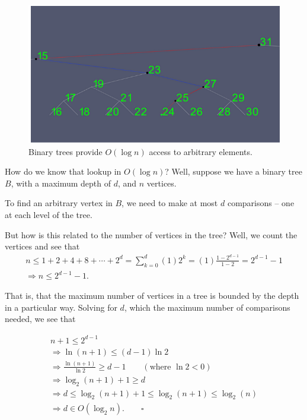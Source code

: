 \documentclass[a4paper,10pt]{report}
\begin{document}
\begin{figure}[h!]
	\begin{centering}
	\begin{center}
	\includegraphics[width=\linewidth]{./binary_tree_search.png}
	\caption{Binary trees provide $O(\log n)$ access to arbitrary elements.}
	\label{fig:??????}
	\end{center}
	\par\end{centering}
\end{figure}
How do we know that lookup in $O(\log n)$? Well, suppose we have a binary tree $B$, with a maximum depth of $d$, and $n$ vertices.

To find an arbitrary vertex in $B$, we need to make at most $d$ comparisons -- one at each level of the tree.

But how is this related to the number of vertices in the tree?
Well, we count the vertices and see that
\begin{align*}
	n \leq 1 + 2 + 4 + 8 + \cdots + 2^d = \sum_{k=0}^d (1)2^k =(1)\frac{1-2^{d-1}}{1-2} = 2^{d-1} -1 \\
	\Rightarrow n \leq 2^{d-1} -1.
\end{align*}

That is, that the maximum number of vertices in a tree is bounded by the depth in a particular way. Solving for $d$, which the maximum number of comparisons needed, we see that

\begin{align*}
	n+1 \leq 2^{d-1}  \\
	\Rightarrow \ln(n+1) \leq (d-1)\ln 2  \\
	\Rightarrow \frac{\ln(n+1)}{\ln 2} \geq d-1 \qquad (\text{where }\ln 2 < 0) \\
	\Rightarrow \log_2(n+1)+1 \geq d \\
	\Rightarrow d \leq \log_2(n+1) +1 \leq \log_2(n+1) \leq \log_2(n) \\
	\Rightarrow d \in O(\log_2 n). \qquad \square
\end{align*}
\end{document}
